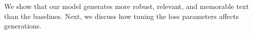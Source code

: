   
We show that our model generates more robust, relevant, and memorable text than the baselines. Next, we discuss how tuning the loss parameters affects generations.
